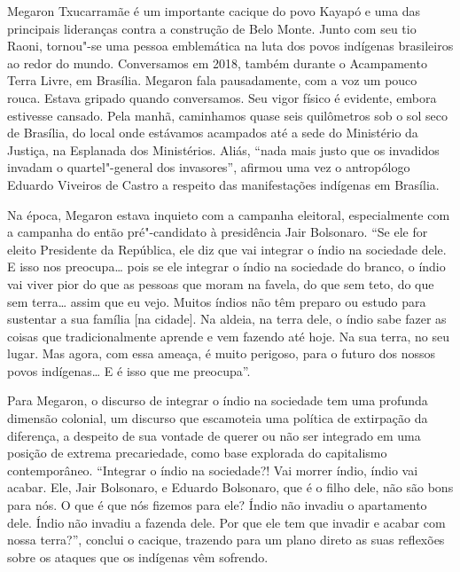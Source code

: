 Megaron Txucarramãe é um importante cacique do povo Kayapó e uma das
principais lideranças contra a construção de Belo Monte. Junto com seu
tio Raoni, tornou"-se uma pessoa emblemática na luta dos povos indígenas
brasileiros ao redor do mundo. Conversamos em 2018, também durante o
Acampamento Terra Livre, em Brasília. Megaron fala pausadamente, com a
voz um pouco rouca. Estava gripado quando conversamos. Seu vigor físico
é evidente, embora estivesse cansado. Pela manhã, caminhamos quase seis
quilômetros sob o sol seco de Brasília, do local onde estávamos
acampados até a sede do Ministério da Justiça, na Esplanada dos
Ministérios. Aliás, ``nada mais justo que os invadidos invadam o
quartel"-general dos invasores'', afirmou uma vez o antropólogo Eduardo
Viveiros de Castro a respeito das manifestações indígenas em Brasília.

Na época, Megaron estava inquieto com a campanha eleitoral,
especialmente com a campanha do então pré"-candidato à presidência Jair
Bolsonaro. ``Se ele for eleito Presidente da República, ele diz que vai
integrar o índio na sociedade dele. E isso nos preocupa\ldots{} pois se
ele integrar o índio na sociedade do branco, o índio vai viver pior do
que as pessoas que moram na favela, do que sem teto, do que sem
terra\ldots{} assim que eu vejo. Muitos índios não têm preparo ou estudo
para sustentar a sua família {[}na cidade{]}. Na aldeia, na terra dele,
o índio sabe fazer as coisas que tradicionalmente aprende e vem fazendo
até hoje. Na sua terra, no seu lugar. Mas agora, com essa ameaça, é
muito perigoso, para o futuro dos nossos povos indígenas\ldots{} E é
isso que me preocupa''.

Para Megaron, o discurso de integrar o índio na sociedade tem uma
profunda dimensão colonial, um discurso que escamoteia uma política de
extirpação da diferença, a despeito de sua vontade de querer ou não ser
integrado em uma posição de extrema precariedade, como base explorada do
capitalismo contemporâneo. ``Integrar o índio na sociedade?! Vai morrer
índio, índio vai acabar. Ele, Jair Bolsonaro, e Eduardo Bolsonaro, que é
o filho dele, não são bons para nós. O que é que nós fizemos para ele?
Índio não invadiu o apartamento dele. Índio não invadiu a fazenda dele.
Por que ele tem que invadir e acabar com nossa terra?'', conclui o
cacique, trazendo para um plano direto as suas reflexões sobre os
ataques que os indígenas vêm sofrendo.

